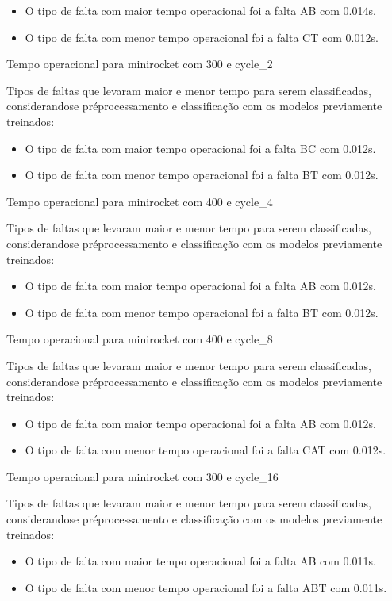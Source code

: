 \begin{itemize}
\item O tipo de falta com maior tempo operacional foi a falta AB com 0.014s.
\item O tipo de falta com menor tempo operacional foi a falta CT com 0.012s.
\end{itemize}
Tempo operacional para minirocket com 300 e cycle_2
\item Tipos de faltas que levaram maior e menor tempo para serem classificadas, considerando\hyph se pré\hyph processamento e classificação com os modelos previamente treinados:
\begin{itemize}
\item O tipo de falta com maior tempo operacional foi a falta BC com 0.012s.
\item O tipo de falta com menor tempo operacional foi a falta BT com 0.012s.
\end{itemize}
Tempo operacional para minirocket com 400 e cycle_4
\item Tipos de faltas que levaram maior e menor tempo para serem classificadas, considerando\hyph se pré\hyph processamento e classificação com os modelos previamente treinados:
\begin{itemize}
\item O tipo de falta com maior tempo operacional foi a falta AB com 0.012s.
\item O tipo de falta com menor tempo operacional foi a falta BT com 0.012s.
\end{itemize}
Tempo operacional para minirocket com 400 e cycle_8
\item Tipos de faltas que levaram maior e menor tempo para serem classificadas, considerando\hyph se pré\hyph processamento e classificação com os modelos previamente treinados:
\begin{itemize}
\item O tipo de falta com maior tempo operacional foi a falta AB com 0.012s.
\item O tipo de falta com menor tempo operacional foi a falta CAT com 0.012s.
\end{itemize}
Tempo operacional para minirocket com 300 e cycle_16
\item Tipos de faltas que levaram maior e menor tempo para serem classificadas, considerando\hyph se pré\hyph processamento e classificação com os modelos previamente treinados:
\begin{itemize}
\item O tipo de falta com maior tempo operacional foi a falta AB com 0.011s.
\item O tipo de falta com menor tempo operacional foi a falta ABT com 0.011s.
\end{itemize}
